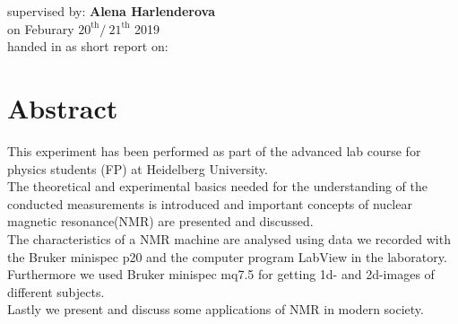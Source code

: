 \begin{center}
	\makeatletter
	\thispagestyle{empty}
	\null\vspace{15mm}
	\Huge\textbf{\@title} \\
	\vspace{14mm}
	\Large  \textbf{\@author} \\
	\large supervised by: \textbf{Alena Harlenderova} \\
	\vspace{4mm}
	\large on Feburary $20^{\text{th}} / \ 21^{\text{th}}$ 2019 \\
	\vspace{15mm}
	\large handed in as short report on: \  \@date \\ 
	\makeatother
	\vspace{20mm}
	\section*{Abstract}
\end{center}
This experiment has been performed as part of the advanced lab course for physics students (FP) at Heidelberg University. 
\vspace{5mm}\\
The theoretical and experimental basics needed for the understanding of the conducted measurements is introduced and important concepts of nuclear magnetic resonance(NMR) are presented and discussed.
\vspace{5mm}\\
The characteristics of a NMR machine are analysed using data we recorded with the Bruker minispec p20 and the computer program LabView in the laboratory.
\vspace{5mm}\\
Furthermore we used Bruker minispec mq7.5 for getting 1d- and 2d-images of different subjects.
\vspace{5mm}\\
Lastly we present and discuss some applications of NMR in modern society.